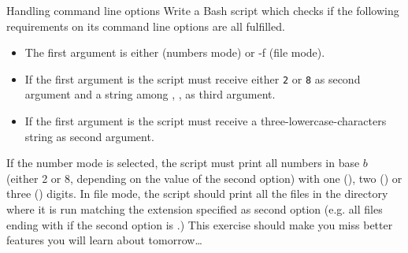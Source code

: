 
\begin{exercise}[Instructive]{Handling command line options}
    Write a Bash script which checks if the following requirements on its command line options are all fulfilled.
    \begin{itemize}
        \item The first argument is  either  (numbers mode) or {-f} (file mode).
        \item If the first argument is  the script must receive either \texttt{2} or \texttt{8} as second argument and a string among , ,  as third argument.
        \item If the first argument is  the script must receive a three-lowercase-characters string as second argument.
    \end{itemize}
    If the number mode is selected, the script must print all numbers in base $b$ (either 2 or 8, depending on the value of the second option) with one (), two () or three () digits.
    In file mode, the script should print all the files in the directory where it is run matching the extension specified as second option (e.g. all files ending with  if the second option is .)
    This exercise should make you miss better features you will learn about tomorrow\ldots
\end{exercise}